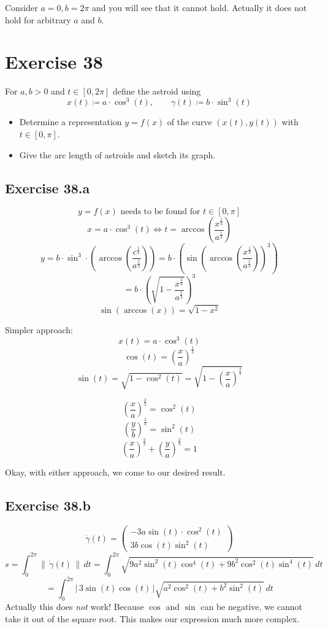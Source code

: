 \documentclass[a4paper]{article}
\theoremstyle{definition}
\newcommand\abs[1]{\left|\,#1\,\right|}
\newcommand\norm[1]{\left\|\,#1\,\right\|}
\begin{document}
Consider $a = 0, b = 2\pi$ and you will see that it cannot hold.
Actually it does not hold for arbitrary $a$ and $b$.

\section{Exercise 38}
\begin{ex}
  For $a,b > 0$ and $t \in [0, 2\pi]$ define the astroid using
  \[ x(t) \coloneqq a \cdot \cos^3(t), \qquad \gamma(t) \coloneqq b \cdot \sin^3(t) \]
  \begin{itemize}
  \item Determine a representation $y = f(x)$ of the curve $(x(t), y(t))$ with $t \in [0,\pi]$.
    \item Give the arc length of astroids and sketch its graph.
  \end{itemize}
\end{ex}

\subsection{Exercise 38.a}
%
\[ y = f(x) \text{ needs to be found for } t \in [0,\pi] \]
\[ x = a \cdot \cos^3(t) \Leftrightarrow t = \arccos\left(\frac{x^{\frac13}}{a^{\frac13}}\right) \]
\[ y = b \cdot \sin^3 \cdot \left(\arccos\left(\frac{c^{\frac13}}{a^{\frac13}}\right)\right)
= b \cdot \left(
  \sin\left(
    \arccos\left(
      \frac{x^{\frac13}}{a^{\frac13}}
    \right)
    \right)^{3}
\right) \] \[
= b \cdot \left(\sqrt{1 - \frac{x^{\frac23}}{a^{\frac23}}}\right)^3
\] \[
  \sin(\arccos(x)) = \sqrt{1 - x^2}
\]

Simpler approach:
\[ x(t) = a \cdot \cos^3(t) \]
\[ \cos(t) = \left(\frac xa\right)^{\frac13} \]
\[ \sin(t) = \sqrt{1 - \cos^2(t)} = \sqrt{1 - \left(\frac xa\right)^{\frac23}} \]

\[ \left(\frac xa\right)^{\frac23} = \cos^2(t) \]
\[ \left(\frac yb\right)^{\frac23} = \sin^2(t) \]
\[ \left(\frac xa\right)^{\frac23} + \left(\frac ya\right)^{\frac23} = 1 \]

Okay, with either approach, we come to our desired result.

\subsection{Exercise 38.b}
%
\[ \dot\gamma(t) = \begin{pmatrix} -3a \sin(t) \cdot \cos^2(t) \\ 3b \cos(t) \sin^2(t) \end{pmatrix} \]
\[
  s = \int_0^{2\pi} \norm{\dot{\gamma}(t)} \, dt
  = \int_0^{2\pi} \sqrt{9a^2 \sin^2(t) \cos^4(t) + 9b^2 \cos^2(t) \sin^4(t)} \, dt
\] \[
= \int_0^{2\pi} \abs{3 \sin(t) \cos(t)} \sqrt{a^2 \cos^2(t) + b^2 \sin^2(t)} \, dt
\]
Actually this does \emph{not} work! Because $\cos$ and $\sin$ can be negative, we cannot take it out of the square root. This makes our expression much more complex.
\end{document}
